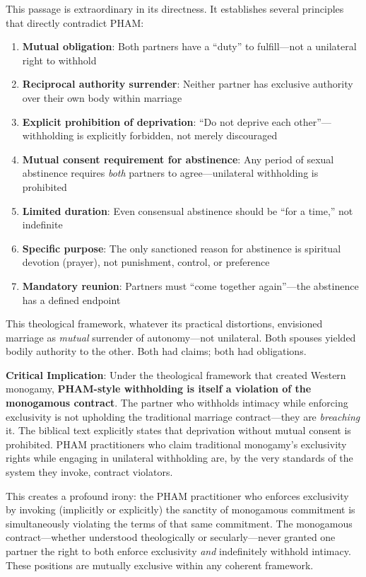 \documentclass[12pt, letterpaper]{article}
\begin{document}
This passage is extraordinary in its directness. It establishes several principles that directly contradict PHAM:

\begin{enumerate}
    \item \textbf{Mutual obligation}: Both partners have a ``duty'' to fulfill---not a unilateral right to withhold
    \item \textbf{Reciprocal authority surrender}: Neither partner has exclusive authority over their own body within marriage
    \item \textbf{Explicit prohibition of deprivation}: ``Do not deprive each other''---withholding is explicitly forbidden, not merely discouraged
    \item \textbf{Mutual consent requirement for abstinence}: Any period of sexual abstinence requires \textit{both} partners to agree---unilateral withholding is prohibited
    \item \textbf{Limited duration}: Even consensual abstinence should be ``for a time,'' not indefinite
    \item \textbf{Specific purpose}: The only sanctioned reason for abstinence is spiritual devotion (prayer), not punishment, control, or preference
    \item \textbf{Mandatory reunion}: Partners must ``come together again''---the abstinence has a defined endpoint
\end{enumerate}

This theological framework, whatever its practical distortions, envisioned marriage as \textit{mutual} surrender of autonomy---not unilateral. Both spouses yielded bodily authority to the other. Both had claims; both had obligations.

\textbf{Critical Implication}: Under the theological framework that created Western monogamy, \textbf{PHAM-style withholding is itself a violation of the monogamous contract}. The partner who withholds intimacy while enforcing exclusivity is not upholding the traditional marriage contract---they are \textit{breaching} it. The biblical text explicitly states that deprivation without mutual consent is prohibited. PHAM practitioners who claim traditional monogamy's exclusivity rights while engaging in unilateral withholding are, by the very standards of the system they invoke, contract violators.

This creates a profound irony: the PHAM practitioner who enforces exclusivity by invoking (implicitly or explicitly) the sanctity of monogamous commitment is simultaneously violating the terms of that same commitment. The monogamous contract---whether understood theologically or secularly---never granted one partner the right to both enforce exclusivity \textit{and} indefinitely withhold intimacy. These positions are mutually exclusive within any coherent framework.
\end{document}

